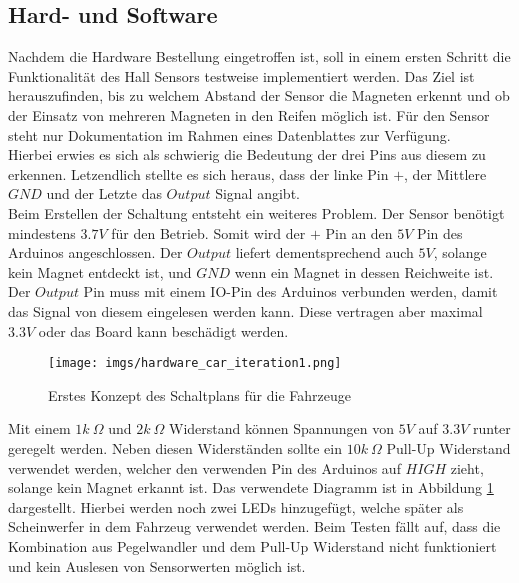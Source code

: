 \documentclass[.../Dokumentation.tex]{subfiles}
\begin{document}
    \subsection{Hard- und Software}
    \label{sec-ita1-hardware}
    Nachdem die Hardware Bestellung eingetroffen ist, soll in einem ersten Schritt die Funktionalität des Hall Sensors testweise implementiert werden. Das Ziel ist herauszufinden, bis zu welchem Abstand der Sensor die Magneten erkennt und ob der Einsatz von mehreren Magneten in den Reifen möglich ist. Für den Sensor steht nur Dokumentation im Rahmen eines Datenblattes zur Verfügung.\\
    Hierbei erwies es sich als schwierig die Bedeutung der drei Pins aus diesem zu erkennen. Letzendlich stellte es sich heraus, dass der linke Pin $+$, der Mittlere $GND$ und der Letzte das $Output$  Signal angibt.\\
    Beim Erstellen der Schaltung entsteht ein weiteres Problem. Der Sensor benötigt mindestens $3.7V$ für den Betrieb. Somit wird der $+$ Pin an den $5V$ Pin des Arduinos angeschlossen. Der $Output$ liefert dementsprechend auch $5V$, solange kein Magnet entdeckt ist, und $GND$ wenn ein Magnet in dessen Reichweite ist. Der $Output$ Pin muss mit einem IO-Pin des Arduinos verbunden werden, damit das Signal von diesem eingelesen werden kann. Diese vertragen aber maximal $3.3V$ oder das Board kann beschädigt werden.
    \begin{figure}[H]
    	\begin{center}
    		\texttt{[image: imgs/hardware\_car\_iteration1.png]}
    		\caption{Erstes Konzept des Schaltplans für die Fahrzeuge}
    		\label{fig-hardware-car-iteration1}
    	\end{center}
    \end{figure}
    Mit einem $1k\ \Omega$ und $2k\ \Omega$ Widerstand können Spannungen von $5V$ auf $3.3V$ runter geregelt werden. Neben diesen Widerständen sollte ein $10k\ \Omega$ Pull-Up Widerstand verwendet werden, welcher den verwenden Pin des Arduinos auf $HIGH$ zieht, solange kein Magnet erkannt ist. Das verwendete Diagramm ist in Abbildung \ref{fig-hardware-car-iteration1} dargestellt. Hierbei werden noch zwei LEDs hinzugefügt, welche später als Scheinwerfer in dem Fahrzeug verwendet werden. Beim Testen fällt auf, dass die Kombination aus Pegelwandler und dem Pull-Up Widerstand nicht funktioniert und kein Auslesen von Sensorwerten möglich ist.
    
\end{document}
